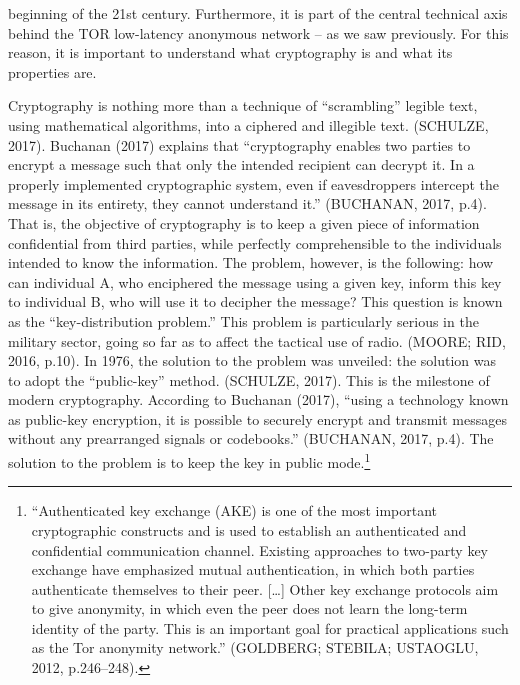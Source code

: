 beginning of the 21st century. Furthermore, it is part of the central technical axis behind the TOR low-latency anonymous network -- as we saw previously. For this reason, it is important to understand what cryptography is and what its properties are.

Cryptography is nothing more than a technique of ``scrambling'' legible text, using mathematical algorithms, into a ciphered and illegible text. (SCHULZE, 2017). Buchanan (2017) explains that ``cryptography enables two parties to encrypt a message such that only the intended recipient can decrypt it. In a properly implemented cryptographic system, even if eavesdroppers intercept the message in its entirety, they cannot understand it.'' (BUCHANAN, 2017, p.4). That is, the objective of cryptography is to keep a given piece of information confidential from third parties, while perfectly comprehensible to the individuals intended to know the information. The problem, however, is the following: how can individual A, who enciphered the message using a given key, inform this key to individual B, who will use it to decipher the message? This question is known as the ``key-distribution problem.'' This problem is particularly serious in the military sector, going so far as to affect the tactical use of radio. (MOORE; RID, 2016, p.10). In 1976, the solution to the problem was unveiled: the solution was to adopt the ``public-key'' method. (SCHULZE, 2017). This is the milestone of modern cryptography. According to Buchanan (2017), ``using a technology known as public-key encryption, it is possible to securely encrypt and transmit messages without any prearranged signals or codebooks.'' (BUCHANAN, 2017, p.4). The solution to the problem is to keep the key in public mode.\footnote{``Authenticated key exchange (AKE) is one of the most important cryptographic constructs and is used to establish an authenticated and confidential communication channel. Existing approaches to two-party key exchange have emphasized mutual authentication, in which both parties authenticate themselves to their peer. {[}\ldots{]} Other key exchange protocols aim to give anonymity, in which even the peer does not learn the long-term identity of the party. This is an important goal for practical applications such as the Tor anonymity network.'' (GOLDBERG; STEBILA; USTAOGLU, 2012, p.246--248).}

